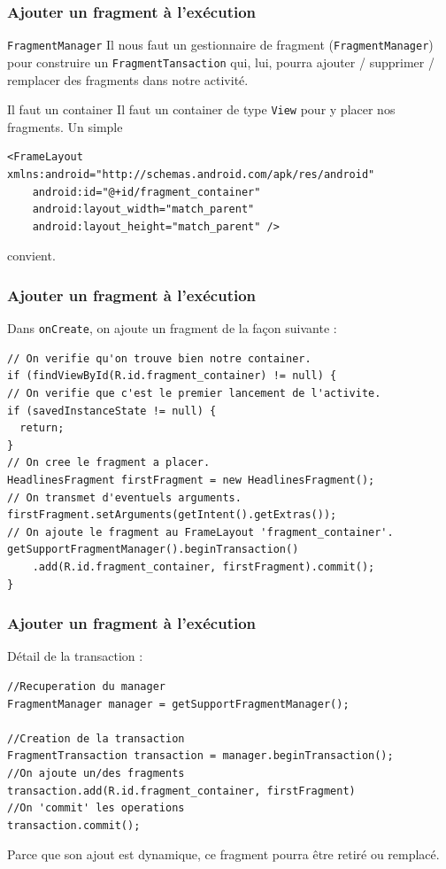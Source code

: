 \documentclass{beamer}
\begin{document}
\begin{frame}[fragile]
\frametitle{Ajouter un fragment à l'exécution}

\begin{block}{\verb!FragmentManager!}
Il nous faut un gestionnaire de fragment (\verb!FragmentManager!) pour construire un \verb!FragmentTansaction! qui, lui, pourra ajouter / supprimer / remplacer des fragments dans notre activité.
\end{block}
\pause
\begin{alertblock}{Il faut un container}
Il faut un container de type \verb!View! pour y placer nos fragments. Un simple
\lstset{language=xml}
\begin{lstlisting}
<FrameLayout xmlns:android="http://schemas.android.com/apk/res/android"
    android:id="@+id/fragment_container"
    android:layout_width="match_parent"
    android:layout_height="match_parent" />
\end{lstlisting}
    convient.
\end{alertblock}
\end{frame}





\begin{frame}[fragile]
\frametitle{Ajouter un fragment à l'exécution}
\begin{block}{}
Dans \verb!onCreate!, on ajoute un fragment de la façon suivante :
\end{block}
\lstset{language=java}
\begin{lstlisting}
// On verifie qu'on trouve bien notre container.
if (findViewById(R.id.fragment_container) != null) {
// On verifie que c'est le premier lancement de l'activite.
if (savedInstanceState != null) {
  return;
}
// On cree le fragment a placer.
HeadlinesFragment firstFragment = new HeadlinesFragment();          
// On transmet d'eventuels arguments.
firstFragment.setArguments(getIntent().getExtras());         
// On ajoute le fragment au FrameLayout 'fragment_container'.
getSupportFragmentManager().beginTransaction()
    .add(R.id.fragment_container, firstFragment).commit();
}
\end{lstlisting}
\end{frame}

\begin{frame}[fragile]
\frametitle{Ajouter un fragment à l'exécution}

\begin{block}{Détail de la transaction :}
\begin{lstlisting}
//Recuperation du manager
FragmentManager manager = getSupportFragmentManager();

//Creation de la transaction
FragmentTransaction transaction = manager.beginTransaction();
//On ajoute un/des fragments
transaction.add(R.id.fragment_container, firstFragment)
//On 'commit' les operations
transaction.commit();
\end{lstlisting}
\end{block}
\begin{exampleblock}{}
Parce que son ajout est dynamique, ce fragment pourra être retiré ou remplacé.
\end{exampleblock}
\end{frame}
\end{document}
